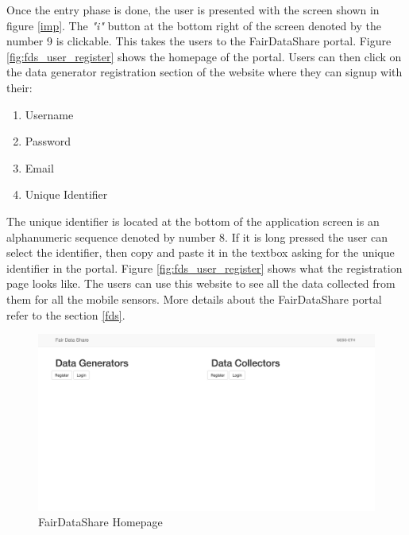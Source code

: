Once the entry phase is done, the user is presented with the screen shown in figure \ref{imp}.
The {\it "i"} button at the bottom right of the screen denoted by the number 9 is clickable. This takes the users to the FairDataShare portal. Figure \ref{fig:fds_user_register} shows the homepage of the portal. Users can then click on the data generator registration section of the website where they can signup with their:

\begin{enumerate}
    \item Username
    \item Password
    \item Email
    \item Unique Identifier
\end{enumerate}

The unique identifier is located at the bottom of the application screen is an alphanumeric sequence denoted by number 8. If it is long pressed the user can select the identifier, then copy and paste it in the  textbox asking for the unique identifier in the portal. Figure \ref{fig:fds_user_register} shows what the registration page looks like.
The users can use this website to see all the data collected from them for all the mobile sensors. More details about the FairDataShare portal
refer to the section \ref{fds}.
%

\begin{figure}[ht!]
\centering
\includegraphics[width=\textwidth,keepaspectratio]{./images/fds}
\caption{FairDataShare Homepage}
\label{fig:fds_home}
\end{figure}

